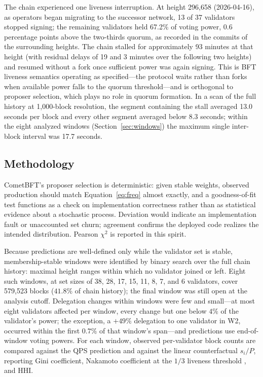 \documentclass[11pt,a4paper]{article}
\begin{document}
The chain experienced one liveness interruption. At height 296{,}658 (2026-04-16), as operators began migrating to the successor network, 13 of 37 validators stopped signing; the remaining validators held 67.2\% of voting power, 0.6 percentage points above the two-thirds quorum, as recorded in the commits of the surrounding heights. The chain stalled for approximately 93 minutes at that height (with residual delays of 19 and 3 minutes over the following two heights) and resumed without a fork once sufficient power was again signing. This is BFT liveness semantics operating as specified---the protocol waits rather than forks when available power falls to the quorum threshold---and is orthogonal to proposer selection, which plays no role in quorum formation. In a scan of the full history at 1{,}000-block resolution, the segment containing the stall averaged 13.0 seconds per block and every other segment averaged below 8.3 seconds; within the eight analyzed windows (Section~\ref{sec:windows}) the maximum single inter-block interval was 17.7 seconds.

\subsection{Methodology}

CometBFT's proposer selection is deterministic: given stable weights, observed production should match Equation~\eqref{eq:freq} almost exactly, and a goodness-of-fit test functions as a check on implementation correctness rather than as statistical evidence about a stochastic process. Deviation would indicate an implementation fault or unaccounted set churn; agreement confirms the deployed code realizes the intended distribution. Pearson $\chi^2$ is reported in this spirit.

Because predictions are well-defined only while the validator set is stable, membership-stable windows were identified by binary search over the full chain history: maximal height ranges within which no validator joined or left. Eight such windows, at set sizes of 38, 28, 17, 15, 11, 8, 7, and 6 validators, cover 579{,}523 blocks ($41.8\%$ of chain history); the final window was still open at the analysis cutoff. Delegation changes within windows were few and small---at most eight validators affected per window, every change but one below $4\%$ of the validator's power; the exception, a $+49\%$ delegation to one validator in W2, occurred within the first $0.7\%$ of that window's span---and predictions use end-of-window voting powers. For each window, observed per-validator block counts are compared against the QPS prediction and against the linear counterfactual $s_i/P$, reporting Gini coefficient, Nakamoto coefficient at the $1/3$ liveness threshold \cite{srinivasan}, and HHI.
\end{document}

